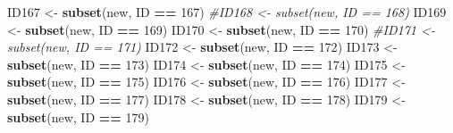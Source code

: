 \documentclass[
]{book}
\newenvironment{Shaded}{\begin{snugshade}}{\end{snugshade}}
\newcommand{\CommentTok}[1]{\textcolor[rgb]{0.56,0.35,0.01}{\textit{#1}}}
\newcommand{\DecValTok}[1]{\textcolor[rgb]{0.00,0.00,0.81}{#1}}
\newcommand{\KeywordTok}[1]{\textcolor[rgb]{0.13,0.29,0.53}{\textbf{#1}}}
\newcommand{\NormalTok}[1]{#1}
\newcommand{\OperatorTok}[1]{\textcolor[rgb]{0.81,0.36,0.00}{\textbf{#1}}}
\newcommand{\StringTok}[1]{\textcolor[rgb]{0.31,0.60,0.02}{#1}}
\begin{document}
\begin{Shaded}
\begin{Highlighting}[]
{{{{{{\NormalTok{ID167 <-}\StringTok{ }\KeywordTok{subset}\NormalTok{(new, ID }\OperatorTok{==}\StringTok{ }\DecValTok{167}\NormalTok{)}
\CommentTok{#ID168 <- subset(new, ID == 168)}
\NormalTok{ID169 <-}\StringTok{ }\KeywordTok{subset}\NormalTok{(new, ID }\OperatorTok{==}\StringTok{ }\DecValTok{169}\NormalTok{)}
\NormalTok{ID170 <-}\StringTok{ }\KeywordTok{subset}\NormalTok{(new, ID }\OperatorTok{==}\StringTok{ }\DecValTok{170}\NormalTok{)}
\CommentTok{#ID171 <- subset(new, ID == 171)}
\NormalTok{ID172 <-}\StringTok{ }\KeywordTok{subset}\NormalTok{(new, ID }\OperatorTok{==}\StringTok{ }\DecValTok{172}\NormalTok{)}
\NormalTok{ID173 <-}\StringTok{ }\KeywordTok{subset}\NormalTok{(new, ID }\OperatorTok{==}\StringTok{ }\DecValTok{173}\NormalTok{)}
\NormalTok{ID174 <-}\StringTok{ }\KeywordTok{subset}\NormalTok{(new, ID }\OperatorTok{==}\StringTok{ }\DecValTok{174}\NormalTok{)}
\NormalTok{ID175 <-}\StringTok{ }\KeywordTok{subset}\NormalTok{(new, ID }\OperatorTok{==}\StringTok{ }\DecValTok{175}\NormalTok{)}
\NormalTok{ID176 <-}\StringTok{ }\KeywordTok{subset}\NormalTok{(new, ID }\OperatorTok{==}\StringTok{ }\DecValTok{176}\NormalTok{)}
\NormalTok{ID177 <-}\StringTok{ }\KeywordTok{subset}\NormalTok{(new, ID }\OperatorTok{==}\StringTok{ }\DecValTok{177}\NormalTok{)}
\NormalTok{ID178 <-}\StringTok{ }\KeywordTok{subset}\NormalTok{(new, ID }\OperatorTok{==}\StringTok{ }\DecValTok{178}\NormalTok{)}
\NormalTok{ID179 <-}\StringTok{ }\KeywordTok{subset}\NormalTok{(new, ID }\OperatorTok{==}\StringTok{ }\DecValTok{179}\NormalTok{)}

}}}}}}
\end{Highlighting}
\end{Shaded}
\end{document}
